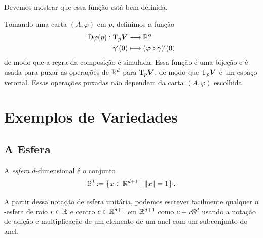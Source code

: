 Devemos mostrar que essa função está bem definida.

Tomando uma carta $(A,\varphi)$ em $p$, definimos a função
	\begin{align*}
	\func{\D \varphi(p)}{\Tg_p \bm V}{\R^d}{\gamma'(0)}{(\varphi \circ \gamma)'(0)}
	\end{align*}
de modo que a regra da composição é simulada. Essa função é uma bijeção e é usada para puxar as operações de $\R^d$ para $\Tg_p \bm V$, de modo que $\Tg_p \bm V$ é um espaço vetorial. Essas operações puxadas não dependem da carta $(A,\varphi)$ escolhida.















\cleardoublepage





\section{Exemplos de Variedades}

\subsection{A Esfera}

\begin{defi}
A \emph{esfera} $d$-dimensional é o conjunto
	\begin{equation*}
	\S^d := \set{x \in \R^{d+1}}{\nor{x}=1}.
	\end{equation*}
\end{defi}

A partir dessa notação de esfera unitária, podemos escrever facilmente qualquer $n$-esfera de raio $r \in \R$ e centro $c \in \R^{d+1}$ em $\R^{d+1}$ como $c + r\S^d$ usando a notação de adição e multiplicação de um elemento de um anel com um subconjunto do anel.

